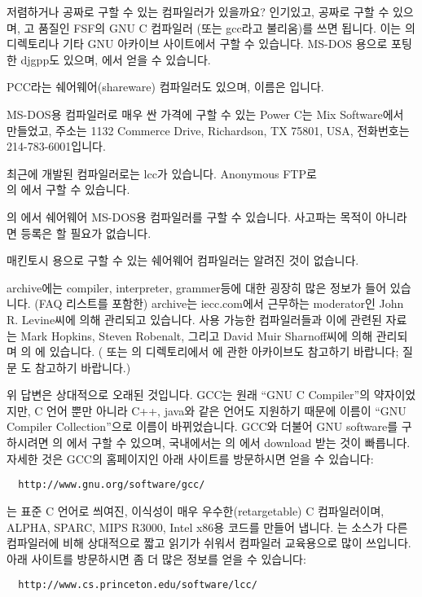 \begin{faq}
	저렴하거나 공짜로 구할 수 있는 컴파일러가 있을까요?
\A
	인기있고, 공짜로 구할 수 있으며, 고 품질인 FSF의 GNU C 컴파일러
	(또는 gcc라고 불리움)를 쓰면 됩니다.  이는 의
	 디렉토리나 기타 GNU 아카이브 사이트에서 구할 수 있습니다.
	MS-DOS 용으로 포팅한 djgpp도 있으며,
	에서 얻을 수 있습니다.

	PCC라는 쉐어웨어(shareware) 컴파일러도 있으며, 이름은
	입니다.

	MS-DOS용 컴파일러로 매우 싼 가격에 구할 수 있는 Power C는
	Mix Software에서 만들었고, 주소는 1132 Commerce Drive, Richardson,
	TX 75801, USA, 전화번호는 214-783-6001입니다.

	최근에 개발된 컴파일러로는 lcc가 있습니다.  Anonymous FTP로 \\
	의 에서 구할 수 있습니다.

	의 에서 쉐어웨어 MS-DOS용
	컴파일러를 구할 수 있습니다.  사고파는 목적이 아니라면 등록은 할 필요가
	없습니다.

	매킨토시 용으로 구할 수 있는 쉐어웨어 컴파일러는 알려진 것이 없습니다.

	 archive에는 compiler, interpreter,
        grammer등에 대한 굉장히 많은 정보가 들어 있습니다.
	(FAQ 리스트를 포함한)  archive는 iecc.com에서
	근무하는 moderator인 John R.  Levine씨에 의해 관리되고 있습니다.
	사용 가능한 컴파일러들과 이에 관련된 자료는 Mark Hopkins, Steven
	Robenalt, 그리고 David Muir Sharnoff씨에 의해 관리되며
	의 에 있습니다.
	( 또는 의 
	디렉토리에서 에 관한 아카이브도 참고하기 바랍니다;
	질문 도 참고하기 바랍니다.)

\T
	위 답변은 상대적으로 오래된 것입니다.   GCC는 원래 ``GNU C Compiler''의
	약자이었지만,  C 언어 뿐만 아니라 C++, java와 같은 언어도 지원하기
	때문에 이름이 ``GNU Compiler Collection''으로 이름이 바뀌었습니다.
	GCC와 더불어 GNU software를 구하시려면 의
	에서
	구할 수 있으며, 국내에서는 의 에서
	download 받는 것이 빠릅니다.   자세한 것은 GCC의 홈페이지인
        아래 사이트를 방문하시면 얻을 수 있습니다:
\begin{verbatim}
  http://www.gnu.org/software/gcc/
\end{verbatim}

	는 표준 C 언어로 씌여진, 이식성이 매우 우수한(retargetable)
        C 컴파일러이며, ALPHA, SPARC, MIPS R3000, Intel x86용 코드를 만들어
        냅니다. 는 소스가 다른 컴파일러에 비해 상대적으로 짧고 읽기가
        쉬워서 컴파일러 교육용으로 많이 쓰입니다. 아래 사이트를 방문하시면
        좀 더 많은 정보를 얻을 수 있습니다:
\begin{verbatim}
  http://www.cs.princeton.edu/software/lcc/
\end{verbatim}


\end{faq}

